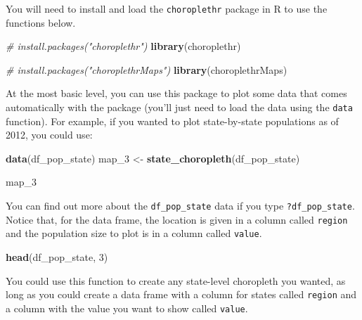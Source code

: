 \documentclass[]{book}
\makeatletter
\newenvironment{Shaded}{\begin{snugshade}}{\end{snugshade}}
\newcommand{\KeywordTok}[1]{\textcolor[rgb]{0.13,0.29,0.53}{\textbf{#1}}}
\newcommand{\DecValTok}[1]{\textcolor[rgb]{0.00,0.00,0.81}{#1}}
\newcommand{\StringTok}[1]{\textcolor[rgb]{0.31,0.60,0.02}{#1}}
\newcommand{\CommentTok}[1]{\textcolor[rgb]{0.56,0.35,0.01}{\textit{#1}}}
\newcommand{\NormalTok}[1]{#1}
\newenvironment{kframe}{%
\medskip{}
\setlength{\fboxsep}{.8em}
 \def\at@end@of@kframe{}%
 \ifinner\ifhmode%
  \def\at@end@of@kframe{\end{minipage}}%
  \begin{minipage}{\columnwidth}%
 \fi\fi%
 \def\FrameCommand##1{\hskip\@totalleftmargin \hskip-\fboxsep
 \colorbox{shadecolor}{##1}\hskip-\fboxsep
     \hskip-\linewidth \hskip-\@totalleftmargin \hskip\columnwidth}%
 \MakeFramed {\advance\hsize-\width
   \@totalleftmargin\z@ \linewidth\hsize
   \@setminipage}}%
 {\par\unskip\endMakeFramed%
 \at@end@of@kframe}
\renewenvironment{Shaded}{\begin{kframe}}{\end{kframe}}
\theoremstyle{definition}
\theoremstyle{definition}
\theoremstyle{definition}
\theoremstyle{remark}
\makeatother
\begin{document}
You will need to install and load the \texttt{choroplethr} package in R
to use the functions below.

\begin{Shaded}
\begin{Highlighting}[]
\CommentTok{# install.packages("choroplethr")}
\KeywordTok{library}\NormalTok{(choroplethr)}

\CommentTok{# install.packages("choroplethrMaps")}
\KeywordTok{library}\NormalTok{(choroplethrMaps)}
\end{Highlighting}
\end{Shaded}

At the most basic level, you can use this package to plot some data that
comes automatically with the package (you'll just need to load the data
using the \texttt{data} function). For example, if you wanted to plot
state-by-state populations as of 2012, you could use:

\begin{Shaded}
\begin{Highlighting}[]
\KeywordTok{data}\NormalTok{(df_pop_state)}
\NormalTok{map_}\DecValTok{3}\NormalTok{ <-}\StringTok{ }\KeywordTok{state_choropleth}\NormalTok{(df_pop_state)}
\end{Highlighting}
\end{Shaded}

\begin{Shaded}
\begin{Highlighting}[]
\NormalTok{map_}\DecValTok{3} 
\end{Highlighting}
\end{Shaded}

You can find out more about the \texttt{df\_pop\_state} data if you type
\texttt{?df\_pop\_state}. Notice that, for the data frame, the location
is given in a column called \texttt{region} and the population size to
plot is in a column called \texttt{value}.

\begin{Shaded}
\begin{Highlighting}[]
\KeywordTok{head}\NormalTok{(df_pop_state, }\DecValTok{3}\NormalTok{)}
\end{Highlighting}
\end{Shaded}

You could use this function to create any state-level choropleth you
wanted, as long as you could create a data frame with a column for
states called \texttt{region} and a column with the value you want to
show called \texttt{value}.
\end{document}
